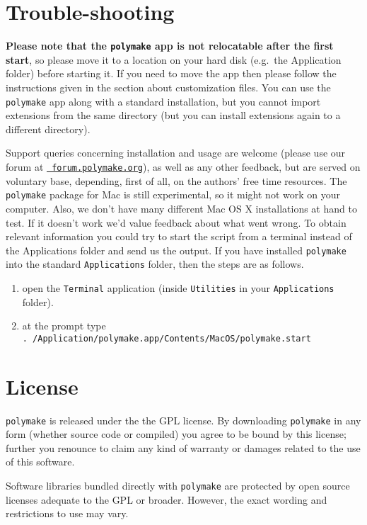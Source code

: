 \documentclass[a4paper]{amsart}
\newcommand{\polymake}{\texttt{polymake}\xspace}
\begin{document}
\section*{Trouble-shooting}

\textbf{Please note that the \polymake app is not relocatable after
  the first start}, so please move it to a location on your hard disk
(e.g.\ the Application folder) before starting it. If you need to move
the app then please follow the instructions given in the section about
customization files. You can use the \polymake app along with a
standard installation, but you cannot import extensions from the same
directory (but you can install extensions again to a different
directory).

Support queries concerning installation and usage are welcome (please
use our forum at \href{http://forum.polymake.org}{\tt
  forum.polymake.org}), as well as any other feedback, but are served
on voluntary base, depending, first of all, on the authors' free time
resources.  The \polymake package for Mac is still experimental, so
it might not work on your computer. Also, we don't have many different
Mac OS X installations at hand to test. If it doesn't work we'd value
feedback about what went wrong. To obtain relevant information you
could try to start the script from a terminal instead of the
Applications folder and send us the output. If you have installed
\polymake into the standard \texttt{Applications} folder, then the
steps are as follows.
\begin{enumerate}
\item open the \texttt{Terminal} application (inside \texttt{Utilities} in your
  \texttt{Applications} folder).
\item at the prompt type\\
 \texttt{. /Application/polymake.app/Contents/MacOS/polymake.start}
\end{enumerate}


\section*{License}

\polymake is released under the the GPL license. By downloading
\polymake in any form (whether source code or compiled) you agree to
be bound by this license; further you renounce to claim
any kind of warranty or damages related to the use of this software.

Software libraries bundled directly with \polymake are protected by
open source licenses adequate to the GPL or broader. However, the
exact wording and restrictions to use may vary. 
\end{document}
